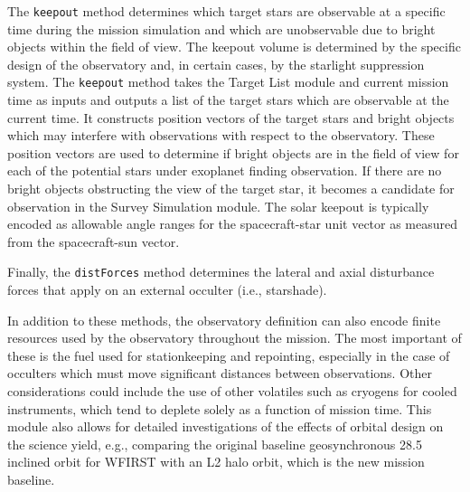 \documentclass[cleanfoot]{asme2ej}
\newcommand{\reffig}[1]{Figure \ref{#1}}
\begin{document}
The \verb+keepout+ method determines which target stars are observable at a specific time during the mission simulation and which are unobservable due to bright objects within the field of view. The keepout volume is determined by the specific design of the observatory and, in certain cases, by the starlight suppression system.  The \verb+keepout+ method takes the Target List module and current mission time as inputs and outputs a list of the target stars which are observable at the current time. It constructs position vectors of the target stars and bright objects which may interfere with observations with respect to the observatory. These position vectors are used to determine if bright objects are in the field of view for each of the potential stars under exoplanet finding observation.  If there are no bright objects obstructing the view of the target star, it becomes a candidate for observation in the Survey Simulation module.  The solar keepout is typically encoded as allowable angle ranges for the spacecraft-star unit vector as measured from the spacecraft-sun vector.



Finally, the \verb+distForces+ method determines the lateral and axial disturbance forces that apply on an external occulter (i.e., starshade).

In addition to these methods, the observatory definition can also encode finite resources used by the observatory throughout the mission.  The most important of these is the fuel used for stationkeeping and repointing, especially in the case of occulters which must move significant distances between observations.  Other considerations could include the use of other volatiles such as cryogens for cooled instruments, which tend to deplete solely as a function of mission time.  This module also allows for detailed investigations of the effects of orbital design on the science yield, e.g., comparing the original baseline geosynchronous 28.5\textdegree{} inclined orbit for WFIRST with an L2 halo orbit, which is the new mission baseline. 


\end{document}
